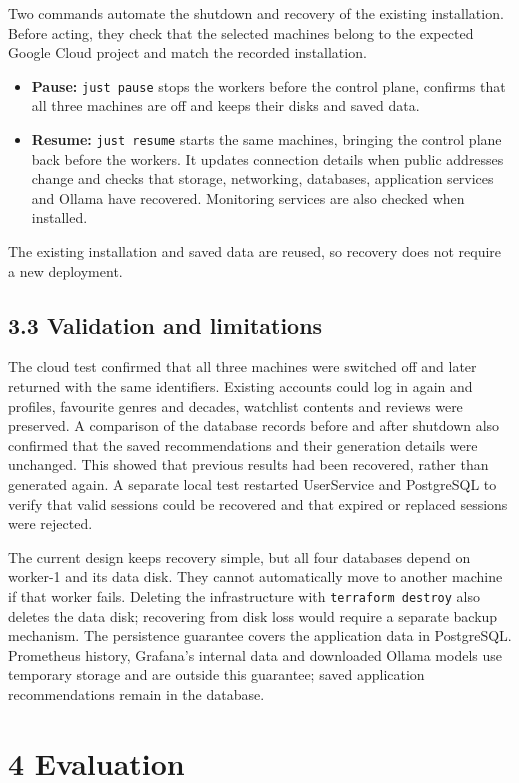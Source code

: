 \documentclass[10pt,a4paper]{article}
\begin{document}
Two commands automate the shutdown and recovery of the existing installation. Before acting, they check that the selected machines belong to the expected Google Cloud project and match the recorded installation.
\begin{itemize}
  \item \textbf{Pause:} \texttt{just pause} stops the workers before the control plane, confirms that all three machines are off and keeps their disks and saved data.
  \item \textbf{Resume:} \texttt{just resume} starts the same machines, bringing the control plane back before the workers. It updates connection details when public addresses change and checks that storage, networking, databases, application services and Ollama have recovered. Monitoring services are also checked when installed.
\end{itemize}
The existing installation and saved data are reused, so recovery does not require a new deployment.

\subsection*{3.3 Validation and limitations}

The cloud test confirmed that all three machines were switched off and later returned with the same identifiers. Existing accounts could log in again and profiles, favourite genres and decades, watchlist contents and reviews were preserved. A comparison of the database records before and after shutdown also confirmed that the saved recommendations and their generation details were unchanged. This showed that previous results had been recovered, rather than generated again. A separate local test restarted UserService and PostgreSQL to verify that valid sessions could be recovered and that expired or replaced sessions were rejected.

The current design keeps recovery simple, but all four databases depend on worker-1 and its data disk. They cannot automatically move to another machine if that worker fails. Deleting the infrastructure with \texttt{terraform destroy} also deletes the data disk; recovering from disk loss would require a separate backup mechanism. The persistence guarantee covers the application data in PostgreSQL. Prometheus history, Grafana's internal data and downloaded Ollama models use temporary storage and are outside this guarantee; saved application recommendations remain in the database.

\section*{4 Evaluation}
\end{document}
